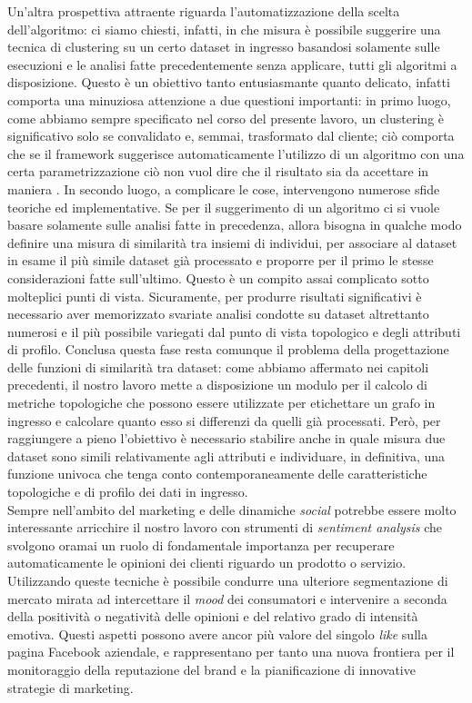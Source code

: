 Un'altra prospettiva attraente riguarda l'automatizzazione della scelta dell'algoritmo: ci siamo chiesti, infatti, in che misura \`e possibile suggerire una tecnica di clustering su un certo dataset in ingresso basandosi solamente sulle esecuzioni e le analisi fatte precedentemente senza applicare, tutti gli algoritmi a disposizione. Questo \`e un obiettivo tanto entusiasmante quanto delicato, infatti comporta una minuziosa attenzione a due questioni importanti: in primo luogo, come abbiamo sempre specificato nel corso del presente lavoro, un clustering \`e significativo solo se convalidato e, semmai, trasformato dal cliente; ci\`o comporta che se il framework suggerisce automaticamente l'utilizzo di un algoritmo con una certa parametrizzazione ci\`o non vuol dire che il risultato sia da accettare in maniera . In secondo luogo, a complicare le cose, intervengono numerose sfide teoriche ed implementative. Se per il suggerimento di un algoritmo ci si vuole basare solamente sulle analisi fatte in precedenza, allora bisogna in qualche modo definire una misura di similarit\`a tra insiemi di individui, per associare al dataset in esame  il pi\`u simile dataset gi\`a processato e proporre per il primo le stesse considerazioni fatte sull'ultimo. Questo \`e un compito assai complicato sotto molteplici punti di vista. Sicuramente, per produrre risultati significativi \`e necessario aver memorizzato svariate analisi condotte su dataset altrettanto numerosi e il pi\`u possibile variegati dal punto di vista topologico e degli attributi di profilo. Conclusa questa fase resta comunque il problema della progettazione delle funzioni di similarit\`a tra dataset: come abbiamo affermato nei capitoli precedenti, il nostro lavoro mette  a disposizione un modulo per il calcolo di metriche topologiche che possono essere utilizzate per etichettare un grafo in ingresso e calcolare quanto esso si differenzi da quelli gi\`a processati. Per\`o, per raggiungere a pieno l'obiettivo \`e necessario stabilire anche in quale misura due dataset sono simili relativamente agli attributi e individuare, in definitiva, una funzione univoca che tenga conto contemporaneamente delle caratteristiche topologiche e di profilo dei dati in ingresso.\\

Sempre nell'ambito del marketing e delle dinamiche \textit{social} potrebbe essere molto interessante arricchire il nostro lavoro con strumenti di \textit{sentiment analysis} che svolgono oramai un ruolo di fondamentale importanza per recuperare automaticamente le opinioni dei clienti riguardo un prodotto o servizio. Utilizzando queste tecniche \`e possibile condurre una ulteriore segmentazione di mercato mirata ad intercettare il \textit{mood} dei consumatori e intervenire a seconda della positivit\`a o negativit\`a delle opinioni e del relativo grado di intensit\`a emotiva. Questi aspetti possono avere ancor pi\`u valore del singolo \textit{like} sulla pagina Facebook aziendale, e rappresentano per tanto una nuova frontiera per il monitoraggio della reputazione del brand e la pianificazione di innovative strategie di marketing.\\

